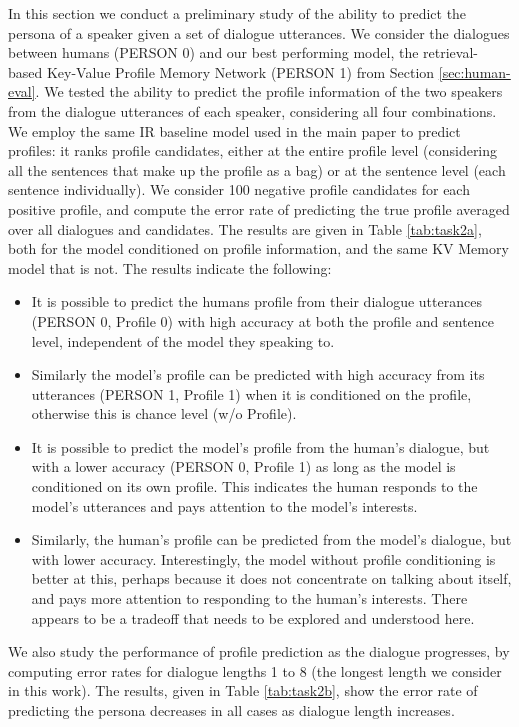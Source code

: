 In this section we conduct a preliminary study of the ability to predict the persona
of a speaker given a set of dialogue utterances. 
We consider the dialogues between humans (PERSON 0)  and our best performing model, the retrieval-based Key-Value Profile Memory Network (PERSON 1) from Section \ref{sec:human-eval}. %
We tested the ability to predict the profile information of the two speakers from the dialogue
utterances of each speaker, considering all four combinations.
We employ the same 
IR baseline model used in the main paper to predict profiles: it ranks profile candidates, either at the entire profile level (considering all the sentences that make up the profile as a bag) or at the  sentence level (each  sentence individually). 
We consider 100 negative profile candidates for each positive profile, and compute the error rate of
predicting the true profile averaged over all dialogues and candidates.
The results are given in Table \ref{tab:task2a},  both for the model conditioned on profile information, and the same KV Memory model that is not.
The results indicate the following:
\begin{itemize}
\item It is possible to predict the humans profile from their dialogue utterances
(PERSON 0, Profile 0) with high accuracy at both the profile and sentence level, independent of the model they speaking to.
\item Similarly the model's profile can be predicted with high accuracy from its utterances (PERSON 1, Profile 1) when it is conditioned on the profile, otherwise this is chance level (w/o Profile).
\item It is possible to predict the model's profile from the human's dialogue, but with a lower accuracy (PERSON 0, Profile 1) as long as the model is conditioned on its own profile. This indicates the human responds to the model's utterances and pays attention to the model's interests. 
\item Similarly, the human's profile can be predicted from the model's dialogue, but with lower accuracy. Interestingly, the model without profile conditioning is better at this, perhaps because it does not concentrate on talking about itself, and pays more attention to responding to the human's interests. There appears to be a tradeoff that needs to be explored and understood here.
\end{itemize}

We also study the performance of profile prediction as the dialogue progresses, by computing error
rates for dialogue lengths 1 to 8 (the longest length we consider in this work). 
The results, given in Table \ref{tab:task2b}, show the error rate of predicting the persona 
decreases in all cases as dialogue length increases.

